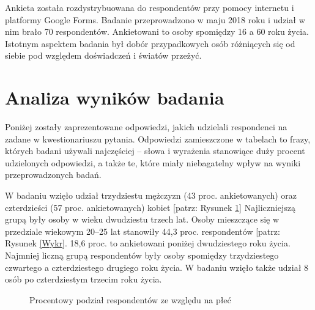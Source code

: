 \documentclass[12pt, a4paper, titlepage]{report}
\begin{document}
Ankieta została rozdystrybuowana do respondentów przy pomocy internetu i platformy Google Forms. Badanie przeprowadzono w maju 2018 roku i udział w nim brało 70 respondentów. Ankietowani to osoby spomiędzy 16 a 60 roku życia. Istotnym aspektem badania był dobór przypadkowych osób różniących się od siebie pod względem doświadczeń i światów przeżyć. 

\section{Analiza wyników badania}
Poniżej zostały zaprezentowane odpowiedzi, jakich udzielali respondenci na zadane w kwestionariuszu pytania. Odpowiedzi zamieszczone w tabelach to frazy, których badani używali najczęściej -- słowa i wyrażenia stanowiące duży procent udzielonych odpowiedzi, a także te, które miały niebagatelny wpływ na wyniki przeprowadzonych badań. 

W badaniu wzięło udział trzydziestu mężczyzn (43 proc. ankietowanych) oraz czterdzieści (57 proc. ankietowanych) kobiet [patrz: Rysunek \ref{Wykres1}] Najliczniejszą grupą były osoby w wieku dwudziestu trzech lat. Osoby mieszczące się w przedziale wiekowym 20--25 lat stanowiły 44,3 proc. respondentów [patrz: Rysunek \ref{Wykr}. 18,6 proc. to ankietowani poniżej dwudziestego roku życia. Najmniej liczną grupą respondentów były osoby spomiędzy trzydziestego czwartego a czterdziestego drugiego roku życia. W badaniu wzięło także udział 8 osób po czterdziestym trzecim roku życia.

\newpage
\begin{figure}[!htb]
\centering
{}
\caption{Procentowy podział respondentów ze względu na płeć}
\label{Wykres1}
\end{figure}
\end{document}
